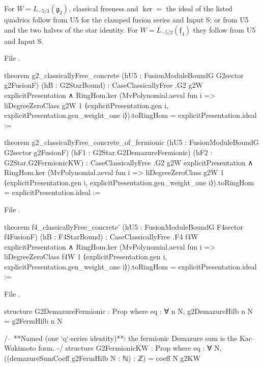 \begin{theorem}\label{l27:thm:G2F4ladder}
For $W=L_{-5/3}(\mathfrak g_2)$, classical freeness and $\ker=$ the ideal of the listed quadrics follow from U5 for the clamped fusion series
and Input S; or from U5 and the two halves of the star identity. For $W=L_{-5/2}(\mathfrak f_4)$ they follow from U5 and Input S.
\end{theorem}
\noindent File .
\begin{leancode}
theorem g2_classicallyFree_concrete (hU5 : FusionModuleBoundG G2sector g2FusionF)
    (hB : G2StarBound) :
    CaseClassicallyFree .G2 g2W explicitPresentation ∧
      RingHom.ker (MvPolynomial.aeval fun i =>
        liDegreeZeroClass g2W 1 ⟨explicitPresentation.gen i,
          explicitPresentation.gen_weight_one i⟩).toRingHom = explicitPresentation.ideal :=
\end{leancode}
\begin{leancode}
theorem g2_classicallyFree_concrete_of_fermionic (hU5 : FusionModuleBoundG G2sector g2FusionF)
    (hF1 : G2Star.G2DemazureFermionic) (hF2 : G2Star.G2FermionicKW) :
    CaseClassicallyFree .G2 g2W explicitPresentation ∧
      RingHom.ker (MvPolynomial.aeval fun i =>
        liDegreeZeroClass g2W 1 ⟨explicitPresentation.gen i,
          explicitPresentation.gen_weight_one i⟩).toRingHom = explicitPresentation.ideal :=
\end{leancode}
\noindent File .
\begin{leancode}
theorem f4_classicallyFree_concrete' (hU5 : FusionModuleBoundG F4sector f4FusionF)
    (hB : F4StarBound) :
    CaseClassicallyFree .F4 f4W explicitPresentation ∧
      RingHom.ker (MvPolynomial.aeval fun i =>
        liDegreeZeroClass f4W 1 ⟨explicitPresentation.gen i,
          explicitPresentation.gen_weight_one i⟩).toRingHom = explicitPresentation.ideal :=
\end{leancode}
\noindent File .
\begin{leancode}
structure G2DemazureFermionic : Prop where
  eq : ∀ n N, g2DemazureHilb n N = g2FermHilb n N

/-- **Named (one `q`-series identity)**: the fermionic Demazure sum is the Kac–Wakimoto form. -/
structure G2FermionicKW : Prop where
  eq : ∀ N, ((demazureSumCoeff g2FermHilb N : ℕ) : ℤ) = coeff N g2KW
\end{leancode}

